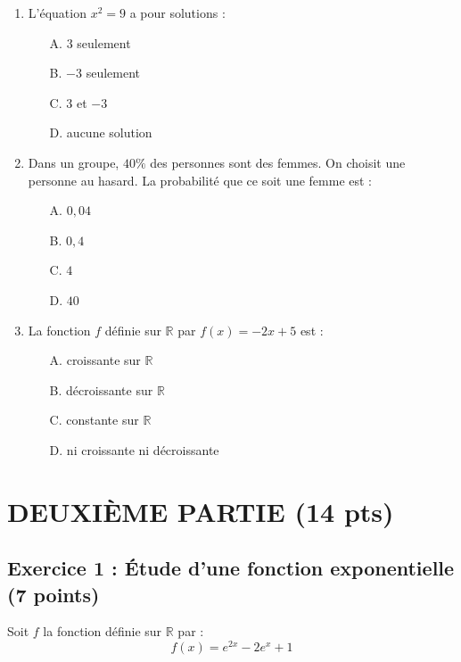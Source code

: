 \documentclass[a4paper,12pt]{article}
\begin{document}
\begin{enumerate}
\item L'équation $x^2 = 9$ a pour solutions :
\begin{itemize}
\item[A.] $3$ seulement
\item[B.] $-3$ seulement
\item[C.] $3$ et $-3$
\item[D.] aucune solution
\end{itemize}

\item Dans un groupe, $40\%$ des personnes sont des femmes. On choisit une personne au hasard. La probabilité que ce soit une femme est :
\begin{itemize}
\item[A.] $0,04$
\item[B.] $0,4$
\item[C.] $4$
\item[D.] $40$
\end{itemize}

\item La fonction $f$ définie sur $\mathbb{R}$ par $f(x) = -2x + 5$ est :
\begin{itemize}
\item[A.] croissante sur $\mathbb{R}$
\item[B.] décroissante sur $\mathbb{R}$
\item[C.] constante sur $\mathbb{R}$
\item[D.] ni croissante ni décroissante
\end{itemize}

\end{enumerate}

\newpage

\section*{DEUXIÈME PARTIE (14 pts)}

\subsection*{Exercice 1 : Étude d'une fonction exponentielle (7 points)}

Soit $f$ la fonction définie sur $\mathbb{R}$ par :
\[
f(x) = e^{2x} - 2e^x + 1
\]
\end{document}
